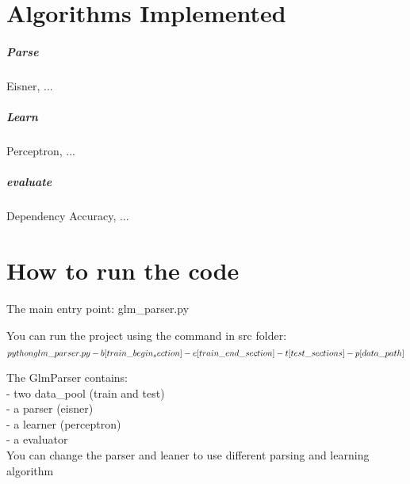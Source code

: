 \documentclass[11pt]{article}
\begin{document}
\section{Algorithms Implemented}

\subparagraph{Parse}
Eisner, ...

\subparagraph{Learn}
Perceptron, ...

\subparagraph{evaluate}
Dependency Accuracy, ...


\section{How to run the code}
The main entry point:
   glm\_parser.py

You can run the project using the command in src folder:
      $$python glm\_parser.py \\
      	-b [train\_begin_section] 
      	-e [train\_end\_section] 
      	-t [test\_sections] 
      	-p [data\_path]$$

The GlmParser contains:\\
      - two data\_pool (train and test) \\
      - a parser (eisner) \\
      - a learner (perceptron) \\
      - a evaluator \\
      
You can change the parser and leaner to use different parsing and learning algorithm
\end{document}
